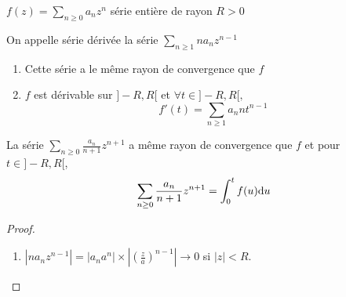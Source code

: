 \begin{thm}
    \Hyp $f(z)=\sum_{n\geq 0}a_nz^n$ série entière de rayon $R>0$
    \begin{concenum}
    \item On appelle série dérivée la série $\sum_{n\geq 1}na_nz^{n-1}$
        \begin{enumerate}
            \item Cette série a le même rayon de convergence que $f$
            \item $f$ est dérivable sur $]-R, R[$ et $\forall t\in ]-R, R[,$ \[
                    f'(t)=\sum_{n\geq 1}a_nnt^{n-1}
                \]
        \end{enumerate}
        \item La série $\sum_{n\geq 0}\frac{a_n}{n+1}z^{n+1}$ a même rayon de convergence que $f$ et pour $t\in ]-R, R[$, \[
            \sum_{n\geq 0}\frac{a_n}{n+1}z^{n+1}=\int_0^tf(u)\mathrm{d} u
            \]
    \end{concenum}
\end{thm}

\begin{proof}
    \begin{enumerate}
        \item $|na_nz^{n-1}|=|a_na^n|\times \left| (\frac za)^{n-1} \right|\xrightarrow{}0$ si $|z|<R$.
    \end{enumerate}
\end{proof}
